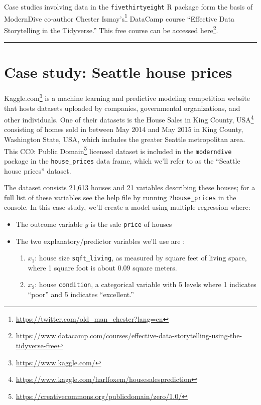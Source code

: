 \documentclass[12pt,]{krantz}
\providecommand{\tightlist}{%
  \setlength{\itemsep}{0pt}\setlength{\parskip}{0pt}}
\renewcommand{\href}[2]{#2\footnote{\url{#1}}}
\theoremstyle{definition}
\theoremstyle{definition}
\theoremstyle{definition}
\theoremstyle{remark}
\begin{document}
Case studies involving data in the \texttt{fivethirtyeight} R package
form the basis of ModernDive co-author
\href{https://twitter.com/old_man_chester?lang=en}{Chester Ismay's}
DataCamp course ``Effective Data Storytelling in the Tidyverse.'' This
free course can be accessed
\href{https://www.datacamp.com/courses/effective-data-storytelling-using-the-tidyverse-free}{here}.

\begin{center}\rule{0.5\linewidth}{\linethickness}\end{center}

\section{Case study: Seattle house prices}\label{seattle-house-prices}

\href{https://www.kaggle.com/}{Kaggle.com} is a machine learning and
predictive modeling competition website that hosts datasets uploaded by
companies, governmental organizations, and other individuals. One of
their datasets is the
\href{https://www.kaggle.com/harlfoxem/housesalesprediction}{House Sales
in King County, USA} consisting of homes sold in between May 2014 and
May 2015 in King County, Washington State, USA, which includes the
greater Seattle metropolitan area. This
\href{https://creativecommons.org/publicdomain/zero/1.0/}{CC0: Public
Domain} licensed dataset is included in the \texttt{moderndive} package
in the \texttt{house\_prices} data frame, which we'll refer to as the
``Seattle house prices'' dataset.

The dataset consists 21,613 houses and 21 variables describing these
houses; for a full list of these variables see the help file by running
\texttt{?house\_prices} in the console. In this case study, we'll create
a model using multiple regression where:

\begin{itemize}
\tightlist
\item
  The outcome variable \(y\) is the sale \texttt{price} of houses
\item
  The two explanatory/predictor variables we'll use are :

  \begin{enumerate}
  \def\labelenumi{\arabic{enumi}.}
  \tightlist
  \item
    \(x_1\): house size \texttt{sqft\_living}, as measured by square
    feet of living space, where 1 square foot is about 0.09 square
    meters.
  \item
    \(x_2\): house \texttt{condition}, a categorical variable with 5
    levels where 1 indicates ``poor'' and 5 indicates ``excellent.''
  \end{enumerate}
\end{itemize}
\end{document}
